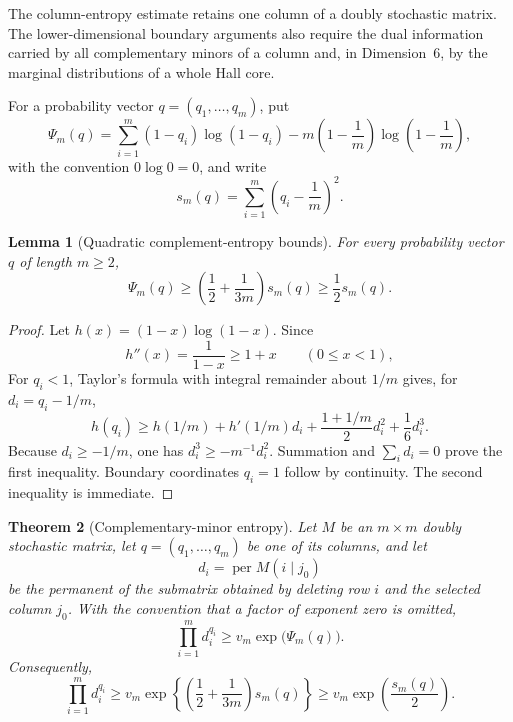 \documentclass[11pt,a4paper]{article}
\numberwithin{equation}{section}
\newtheorem{theorem}{Theorem}[section]
\newtheorem{lemma}[theorem]{Lemma}
\theoremstyle{definition}
\newcommand{\per}{\operatorname{per}}
\newcommand{\1}{\mathbf{1}}
\begin{document}
The column-entropy estimate retains one column of a doubly stochastic
matrix.  The lower-dimensional boundary arguments also require the dual
information carried by all complementary minors of a column and, in
Dimension~6, by the marginal distributions of a whole Hall core.

For a probability vector $q=(q_1,\dots,q_m)$, put
\begin{equation}\label{eq:Psi-definition}
 \Psi_m(q)=
 \sum_{i=1}^m(1-q_i)\log(1-q_i)
 -m\left(1-\frac1m\right)\log\left(1-\frac1m\right),
\end{equation}
with the convention $0\log0=0$, and write
\[
 s_m(q)=\sum_{i=1}^m\left(q_i-\frac1m\right)^2.
\]

\begin{lemma}[Quadratic complement-entropy bounds]\label{lem:Psi-bounds}
For every probability vector $q$ of length $m\ge2$,
\begin{equation}\label{eq:Psi-bounds}
 \Psi_m(q)\ge
 \left(\frac12+\frac1{3m}\right)s_m(q)
 \ge\frac12s_m(q).
\end{equation}
\end{lemma}

\begin{proof}
Let $h(x)=(1-x)\log(1-x)$.  Since
\[
 h''(x)=\frac1{1-x}\ge1+x
 \qquad(0\le x<1),
\]
For $q_i<1$, Taylor's formula with integral remainder about $1/m$ gives, for
$d_i=q_i-1/m$,
\[
 h(q_i)\ge h(1/m)+h'(1/m)d_i
 +\frac{1+1/m}{2}d_i^2+\frac16d_i^3.
\]
Because $d_i\ge-1/m$, one has $d_i^3\ge-m^{-1}d_i^2$.
Summation and $\sum_i d_i=0$ prove the first inequality.  Boundary
coordinates $q_i=1$ follow by continuity.  The second inequality is
immediate.
\end{proof}

\begin{theorem}[Complementary-minor entropy]\label{thm:minor-entropy}
Let $M$ be an $m\times m$ doubly stochastic matrix, let
$q=(q_1,\dots,q_m)$ be one of its columns, and let
\[
 d_i=\per M(i\mid j_0)
\]
be the permanent of the submatrix obtained by deleting row $i$ and the
selected column $j_0$.  With the convention that a factor of exponent zero
is omitted,
\begin{equation}\label{eq:minor-entropy-exact}
 \prod_{i=1}^m d_i^{q_i}
 \ge v_m\exp\bigl(\Psi_m(q)\bigr).
\end{equation}
Consequently,
\begin{equation}\label{eq:minor-entropy}
 \prod_{i=1}^m d_i^{q_i}
 \ge v_m\exp\left\{
 \left(\frac12+\frac1{3m}\right)s_m(q)
 \right\}
 \ge v_m\exp\left(\frac{s_m(q)}2\right).
\end{equation}
\end{theorem}
\end{document}
